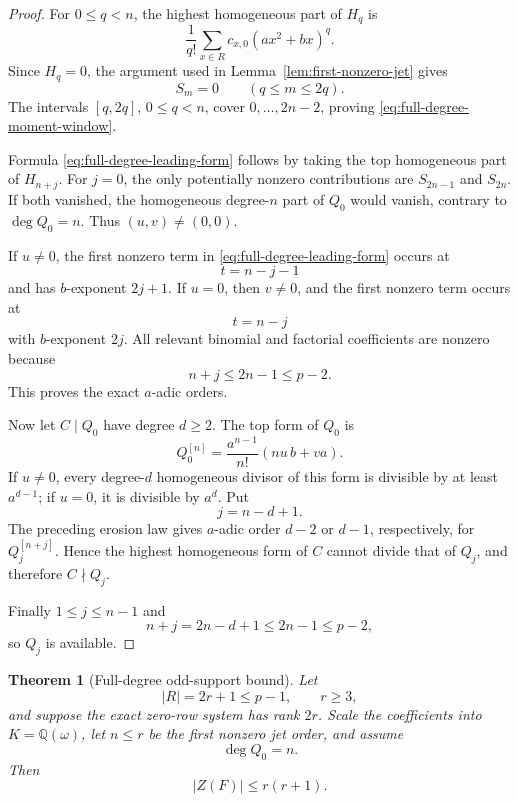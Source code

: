 \documentclass[11pt]{article}
\newtheorem{theorem}{Theorem}[section]
\newcommand{\Q}{\mathbb Q}
\begin{document}
\begin{proof}
For \(0\le q<n\), the highest homogeneous part of \(H_q\) is
\[
 \frac1{q!}
 \sum_{x\in R}c_{x,0}(ax^2+bx)^q.
\]
Since \(H_q=0\), the argument used in
Lemma~\ref{lem:first-nonzero-jet} gives
\[
 S_m=0
 \qquad(q\le m\le2q).
\]
The intervals \([q,2q]\), \(0\le q<n\), cover
\(0,\ldots,2n-2\), proving
\eqref{eq:full-degree-moment-window}.

Formula \eqref{eq:full-degree-leading-form} follows by taking the top
homogeneous part of \(H_{n+j}\).  For \(j=0\), the only potentially
nonzero contributions are \(S_{2n-1}\) and \(S_{2n}\).  If both
vanished, the homogeneous degree-\(n\) part of \(Q_0\) would vanish,
contrary to \(\deg Q_0=n\).  Thus \((u,v)\ne(0,0)\).

If \(u\ne0\), the first nonzero term in
\eqref{eq:full-degree-leading-form} occurs at
\[
 t=n-j-1
\]
and has \(b\)-exponent \(2j+1\).  If \(u=0\), then \(v\ne0\), and the
first nonzero term occurs at
\[
 t=n-j
\]
with \(b\)-exponent \(2j\).  All relevant binomial and factorial
coefficients are nonzero because
\[
 n+j\le2n-1\le p-2.
\]
This proves the exact \(a\)-adic orders.

Now let \(C\mid Q_0\) have degree \(d\ge2\).
The top form of \(Q_0\) is
\[
 Q_0^{[n]}
 =
 \frac{a^{n-1}}{n!}(nu\,b+va).
\]
If \(u\ne0\), every degree-\(d\) homogeneous divisor of this form is
divisible by at least \(a^{d-1}\); if \(u=0\), it is divisible by
\(a^d\).  Put
\[
 j=n-d+1.
\]
The preceding erosion law gives \(a\)-adic order \(d-2\) or \(d-1\),
respectively, for \(Q_j^{[n+j]}\).  Hence the highest homogeneous form
of \(C\) cannot divide that of \(Q_j\), and therefore \(C\nmid Q_j\).

Finally \(1\le j\le n-1\) and
\[
 n+j=2n-d+1\le2n-1\le p-2,
\]
so \(Q_j\) is available.
\end{proof}

\begin{theorem}[Full-degree odd-support bound]
\label{thm:full-degree-odd-bound}
Let
\[
 |R|=2r+1\le p-1,\qquad r\ge3,
\]
and suppose the exact zero-row system has rank \(2r\).
Scale the coefficients into \(K=\Q(\omega)\), let \(n\le r\) be the
first nonzero jet order, and assume
\[
 \deg Q_0=n.
\]
Then
\begin{equation}
 \boxed{|Z(F)|\le r(r+1).}
 \label{eq:full-degree-odd-bound}
\end{equation}
\end{theorem}
\end{document}
